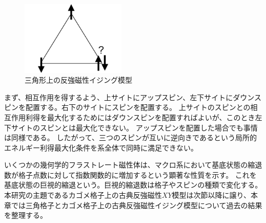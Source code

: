 \documentclass[12pt,titlepage,dvipdfmx]{jarticle}
\begin{document}
\begin{figure}[tbh]
   \centering
   \includegraphics[width=5cm]{figure/triangle_Ising_AFM.pdf}
   \caption{三角形上の反強磁性イジング模型}
\end{figure}
   
まず、相互作用を得するよう、上サイトにアップスピン、左下サイトにダウンスピンを配置する。右下のサイトにスピンを配置する。
上サイトのスピンとの相互作用利得を最大化するためにはダウンスピンを配置すればよいが、このとき左下サイトのスピンとは最大化できない。
アップスピンを配置した場合でも事情は同様である。
したがって、三つのスピンが互いに逆向きであるという局所的エネルギー利得最大化条件を系全体で同時に満足できない。

いくつかの幾何学的フラストレート磁性体は、マクロ系において基底状態の縮退数が格子点数に対して指数関数的に増加するという顕著な性質を示す。
これを基底状態の巨視的縮退という。巨視的縮退数は格子やスピンの種類で変化する。
本研究の主題であるカゴメ格子上の古典反強磁性$XY$模型は次節以降に譲り、本章では三角格子とカゴメ格子上の古典反強磁性イジング模型について過去の結果を整理する。
\end{document}
